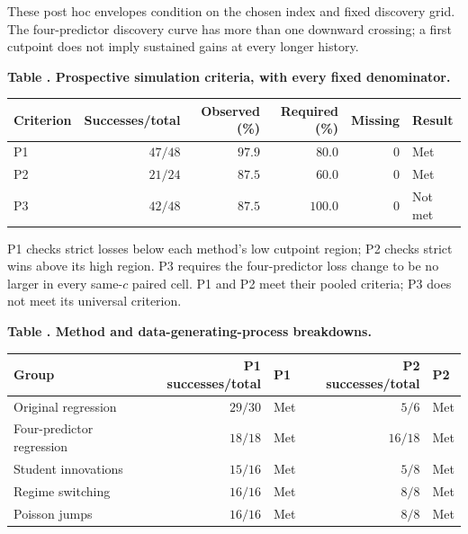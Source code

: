 \noindent\begin{minipage}{0.98\linewidth}\scriptsize These post hoc envelopes condition on the chosen index and fixed discovery grid. The four-predictor discovery curve has more than one downward crossing; a first cutpoint does not imply sustained gains at every longer history.\end{minipage}\par\smallskip
\par\medskip{}\label{tab:v9-confirmation-pooled}
\noindent\textbf{Table \thetable. Prospective simulation criteria, with every fixed denominator.}\par
\begin{center}\begin{tabular}{lrrrrl}
\toprule
Criterion & Successes/total & Observed (\%) & Required (\%) & Missing & Result \\
\midrule
P1 & $47/48$ & $97.9$ & $80.0$ & $0$ & Met \\ %
P2 & $21/24$ & $87.5$ & $60.0$ & $0$ & Met \\ %
P3 & $42/48$ & $87.5$ & $100.0$ & $0$ & Not met \\ %
\bottomrule
\end{tabular}\end{center}
\noindent\begin{minipage}{0.98\linewidth}\scriptsize P1 checks strict losses below each method's low cutpoint region; P2 checks strict wins above its high region. P3 requires the four-predictor loss change to be no larger in every same-$c$ paired cell. P1 and P2 meet their pooled criteria; P3 does not meet its universal criterion.\end{minipage}\par\smallskip
\par\medskip{}\label{tab:v9-confirmation-subgroups}
\noindent\textbf{Table \thetable. Method and data-generating-process breakdowns.}\par
\begin{center}\begin{tabular}{p{38mm}rlrl}
\toprule
Group & P1 successes/total & P1 & P2 successes/total & P2 \\
\midrule
Original regression & $29/30$ & Met & $5/6$ & Met \\ %
Four-predictor regression & $18/18$ & Met & $16/18$ & Met \\ %
Student innovations & $15/16$ & Met & $5/8$ & Met \\ %
Regime switching & $16/16$ & Met & $8/8$ & Met \\ %
Poisson jumps & $16/16$ & Met & $8/8$ & Met \\ %
\bottomrule
\end{tabular}\end{center}
\clearpage
